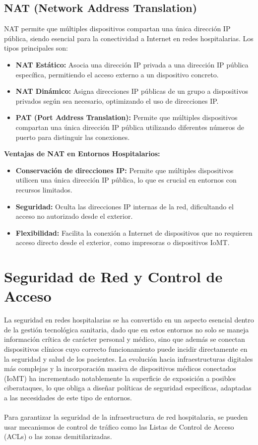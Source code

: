 \subsection{NAT (Network Address Translation)}
\label{subsec:nat}
NAT permite que múltiples dispositivos compartan una única dirección IP pública, siendo esencial para la conectividad a Internet en redes hospitalarias. Los tipos principales son:
\begin{itemize}
    \item \textbf{NAT Estático:} Asocia una dirección IP privada a una dirección IP pública específica, permitiendo el acceso externo a un dispositivo concreto.
    \item \textbf{NAT Dinámico:} Asigna direcciones IP públicas de un grupo a dispositivos privados según sea necesario, optimizando el uso de direcciones IP.
    \item \textbf{PAT (Port Address Translation):} Permite que múltiples dispositivos compartan una única dirección IP pública utilizando diferentes números de puerto para distinguir las conexiones.
\end{itemize}

\textbf{Ventajas de NAT en Entornos Hospitalarios:}
\begin{itemize}
    \item \textbf{Conservación de direcciones IP:} Permite que múltiples dispositivos utilicen una única dirección IP pública, lo que es crucial en entornos con recursos limitados.
    \item \textbf{Seguridad:} Oculta las direcciones IP internas de la red, dificultando el acceso no autorizado desde el exterior.
    \item \textbf{Flexibilidad:} Facilita la conexión a Internet de dispositivos que no requieren acceso directo desde el exterior, como impresoras o dispositivos IoMT.
\end{itemize}

\section{Seguridad de Red y Control de Acceso}
La seguridad en redes hospitalarias se ha convertido en un aspecto esencial dentro de la gestión tecnológica sanitaria, dado que en estos entornos no solo se maneja información 
crítica de carácter personal y médico, sino que además se conectan dispositivos clínicos cuyo correcto funcionamiento puede incidir directamente en la seguridad y salud de 
los pacientes. La evolución hacia infraestructuras digitales más complejas y la incorporación masiva de dispositivos médicos conectados (IoMT) ha incrementado notablemente 
la superficie de exposición a posibles ciberataques, lo que obliga a diseñar políticas de seguridad específicas, adaptadas a las necesidades de este tipo de entornos.
\\ \\
Para garantizar la seguridad de la infraestructura de red hospitalaria, se pueden usar mecanismos de control de tráfico como las Listas de Control de Acceso (ACLs) o las zonas demitilarizadas. 

